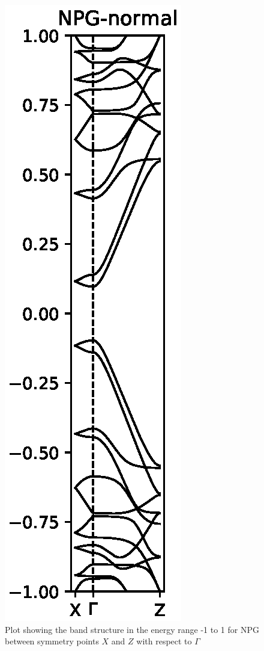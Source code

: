 \begin{figure}[H]
	\centering
	\includegraphics{Figures/FabNPGBS.eps}
	\caption{Plot showing the band structure in the energy range -1 to 1 for NPG between symmetry points \(X\) and \(Z\) with respect to \(\Gamma\)}
	\label{Fab}
\end{figure}
